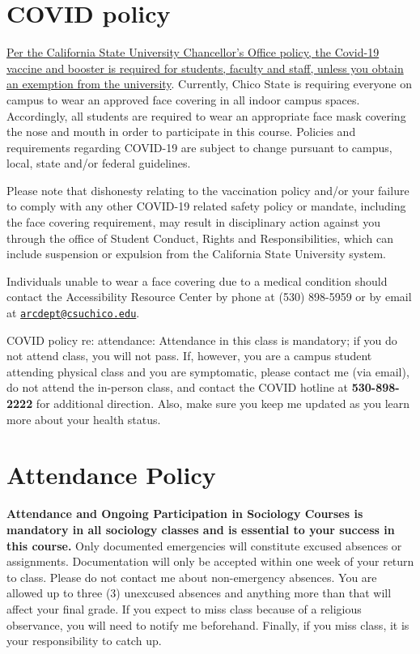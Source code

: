 \documentclass[11pt,]{article}
\begin{document}
\hypertarget{covid-policy}{%
\section{COVID policy}\label{covid-policy}}

\href{https://calstate.policystat.com/policy/11030468/latest/}{Per the
California State University Chancellor's Office policy, the Covid-19
vaccine and booster is required for students, faculty and staff, unless
you obtain an exemption from the university}. Currently, Chico State is
requiring everyone on campus to wear an approved face covering in all
indoor campus spaces. Accordingly, all students are required to wear an
appropriate face mask covering the nose and mouth in order to
participate in this course. Policies and requirements regarding COVID-19
are subject to change pursuant to campus, local, state and/or federal
guidelines.

Please note that dishonesty relating to the vaccination policy and/or
your failure to comply with any other COVID-19 related safety policy or
mandate, including the face covering requirement, may result in
disciplinary action against you through the office of Student Conduct,
Rights and Responsibilities, which can include suspension or expulsion
from the California State University system.

Individuals unable to wear a face covering due to a medical condition
should contact the Accessibility Resource Center by phone at (530)
898-5959 or by email at
\href{mailto:arcdept@csuchico.edu}{\nolinkurl{arcdept@csuchico.edu}}.

COVID policy re: attendance: Attendance in this class is mandatory; if
you do not attend class, you will not pass. If, however, you are a
campus student attending physical class and you are symptomatic, please
contact me (via email), do not attend the in-person class, and contact
the COVID hotline at \textbf{530-898-2222} for additional direction.
Also, make sure you keep me updated as you learn more about your health
status.

\hypertarget{attendance}{%
\section{Attendance Policy}\label{attendance}}

\textbf{Attendance and Ongoing Participation in Sociology Courses is
mandatory in all sociology classes and is essential to your success in
this course.} Only documented emergencies will constitute excused
absences or assignments. Documentation will only be accepted within one
week of your return to class. Please do not contact me about
non-emergency absences. You are allowed up to three (3) unexcused
absences and anything more than that will affect your final grade. If
you expect to miss class because of a religious observance, you will
need to notify me beforehand. Finally, if you miss class, it is your
responsibility to catch up.
\end{document}
